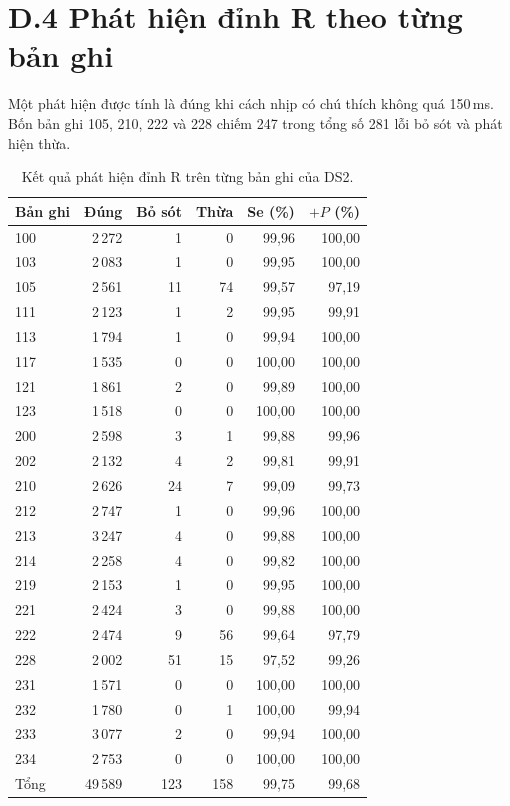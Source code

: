 \section*{D.4 Phát hiện đỉnh R theo từng bản ghi}

Một phát hiện được tính là đúng khi cách nhịp có chú thích không quá 150\,ms.
Bốn bản ghi 105, 210, 222 và 228 chiếm 247 trong tổng số 281 lỗi bỏ sót và phát hiện thừa.
\begin{table}[htbp]\centering
\caption{Kết quả phát hiện đỉnh R trên từng bản ghi của DS2.}\label{tab:pld-det}
\small\begin{tabular}{lrrrrr}\toprule
Bản ghi & Đúng & Bỏ sót & Thừa & Se (\%) & $+P$ (\%) \\ \midrule
100 & 2\,272 & 1 & 0 & 99{,}96 & 100{,}00 \\
103 & 2\,083 & 1 & 0 & 99{,}95 & 100{,}00 \\
105 & 2\,561 & 11 & 74 & 99{,}57 & 97{,}19 \\
111 & 2\,123 & 1 & 2 & 99{,}95 & 99{,}91 \\
113 & 1\,794 & 1 & 0 & 99{,}94 & 100{,}00 \\
117 & 1\,535 & 0 & 0 & 100{,}00 & 100{,}00 \\
121 & 1\,861 & 2 & 0 & 99{,}89 & 100{,}00 \\
123 & 1\,518 & 0 & 0 & 100{,}00 & 100{,}00 \\
200 & 2\,598 & 3 & 1 & 99{,}88 & 99{,}96 \\
202 & 2\,132 & 4 & 2 & 99{,}81 & 99{,}91 \\
210 & 2\,626 & 24 & 7 & 99{,}09 & 99{,}73 \\
212 & 2\,747 & 1 & 0 & 99{,}96 & 100{,}00 \\
213 & 3\,247 & 4 & 0 & 99{,}88 & 100{,}00 \\
214 & 2\,258 & 4 & 0 & 99{,}82 & 100{,}00 \\
219 & 2\,153 & 1 & 0 & 99{,}95 & 100{,}00 \\
221 & 2\,424 & 3 & 0 & 99{,}88 & 100{,}00 \\
222 & 2\,474 & 9 & 56 & 99{,}64 & 97{,}79 \\
228 & 2\,002 & 51 & 15 & 97{,}52 & 99{,}26 \\
231 & 1\,571 & 0 & 0 & 100{,}00 & 100{,}00 \\
232 & 1\,780 & 0 & 1 & 100{,}00 & 99{,}94 \\
233 & 3\,077 & 2 & 0 & 99{,}94 & 100{,}00 \\
234 & 2\,753 & 0 & 0 & 100{,}00 & 100{,}00 \\
\midrule Tổng & 49\,589 & 123 & 158 & 99{,}75 & 99{,}68 \\
\bottomrule\end{tabular}\end{table}
